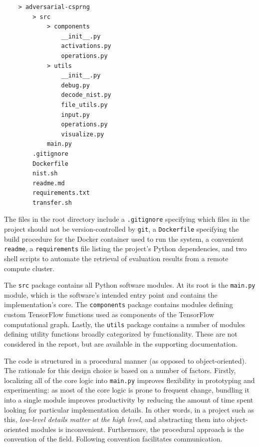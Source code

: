 \documentclass[12pt, titlepage]{report}
\theoremstyle{definition}
\begin{document}
\begin{verbatim}
    > adversarial-csprng    
        > src
            > components
                __init__.py
                activations.py
                operations.py
            > utils
                __init__.py
                debug.py
                decode_nist.py
                file_utils.py
                input.py
                operations.py
                visualize.py
            main.py
        .gitignore
        Dockerfile
        nist.sh
        readme.md
        requirements.txt
        transfer.sh
\end{verbatim}

The files in the root directory include a \texttt{.gitignore} specifying which files in the project should not be version-controlled by \texttt{git}, a \texttt{Dockerfile} specifying the build procedure for the Docker container used to run the system, a convenient \texttt{readme}, a \texttt{requirements} file listing the project's Python dependencies, and two shell scripts to automate the retrieval of evaluation results from a remote compute cluster.

The \texttt{src} package contains all Python software modules. At its root is the \texttt{main.py} module, which is the software's intended entry point and contains the implementation's core. The \texttt{components} package contains modules defining custom TensorFlow functions used as components of the TensorFlow computational graph. Lastly, the \texttt{utils} package contains a number of modules defining utility functions broadly categorized by functionality. These are not considered in the report, but are available in the supporting documentation.

The code is structured in a procedural manner (as opposed to object-oriented). The rationale for this design choice is based on a number of factors. Firstly, localizing all of the core logic into \texttt{main.py} improves flexibility in prototyping and experimenting: as most of the core logic is prone to frequent change, bundling it into a single module improves productivity by reducing the amount of time spent looking for particular implementation details. In other words, in a project such as this, \emph{low-level details matter at the high level}, and abstracting them into object-oriented modules is inconvenient. Furthermore, the procedural approach is the convention of the field. Following convention facilitates communication.
\end{document}
